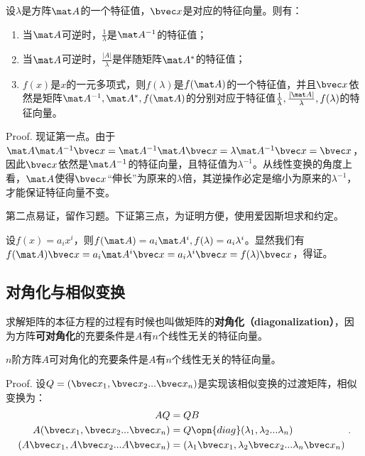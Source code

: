 \begin{theorem}{}
设$\lambda$是方阵$\mat A$的一个特征值，$\bvec x$是对应的特征向量。则有：
\begin{enumerate}
\item 当$\mat A$可逆时，$\frac{1}{\lambda }$是$\mat A^{-1}$的特征值；
\item 当$\mat A$可逆时，$\frac{|A|}{\lambda }$是伴随矩阵$\mat A^{*}$的特征值；
\item $f(x)$是$x$的一元多项式，则$f(\lambda)$是$f(\mat A)$的一个特征值，并且$\bvec x$依然是矩阵$\mat A^{-1},\mat A^{*},f(\mat A)$的分别对应于特征值$\frac{1}{\lambda},\frac{|\mat A|}{\lambda},f(\lambda)$的特征向量。
\end{enumerate}
\end{theorem}
Proof.
现证第一点。由于$\mat A\mat A^{-1}\bvec x=\mat A^{-1}\mat A \bvec x=\lambda \mat A^{-1} \bvec x=\bvec x$，因此$\bvec x$依然是$\mat A^{-1}$的特征向量，且特征值为$\lambda^{-1} $。从线性变换的角度上看，$\mat A$使得$\bvec x$“伸长”为原来的$\lambda$倍，其逆操作必定是缩小为原来的$\lambda^{-1}$，才能保证特征向量不变。

第二点易证，留作习题。下证第三点，为证明方便，使用爱因斯坦求和约定。

设$f(x)=a_ix^i$，则$f(\mat A)=a_i\mat A^i,f(\lambda)=a_i\lambda ^i$。显然我们有$f(\mat A)\bvec x=a_i\mat A^i \bvec x=a_i\lambda^i \bvec x=f(\lambda)\bvec x$，得证。

\subsection{对角化与相似变换}

求解矩阵的本征方程的过程有时候也叫做矩阵的\textbf{对角化（diagonalization）}，因为方阵\textbf{可对角化}的充要条件是$A$有$n$个线性无关的特征向量。
\begin{theorem}{}\label{the_MatEig_1}
$n$阶方阵$A$可对角化的充要条件是$A$有$n$个线性无关的特征向量。
\end{theorem}
Proof.
设$Q=(\bvec x_1,\bvec x_2...
\bvec x_n)$是实现该相似变换的过渡矩阵，相似变换为：
\begin{equation}
\begin{aligned}
AQ&=QB\\
A(\bvec x_1,\bvec x_2...
\bvec x_n)&=Q\opn{diag}(\lambda_1,\lambda_2...\lambda_n)\\
(A\bvec x_1,A\bvec x_2...
A\bvec x_n)&=(\lambda_1 \bvec x_1,\lambda_2\bvec x_2...\lambda_n\bvec x_n)\\
\end{aligned}~.
\end{equation}

